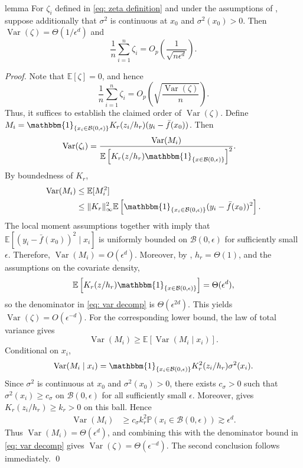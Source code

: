 \documentclass[11pt]{article}
\begin{document}
\begin{appendices}
\begin{restatable}{lemma}{} \label{lemma: zeta}
    For $\zeta_i$ defined in \cref{eq: zeta definition} and under the assumptions of , suppose additionally that $\sigma^2$ is continuous at $x_0$ and $\sigma^2(x_0)>0$. Then $\operatorname{Var}(\zeta) = \Theta(1/\epsilon^d)$ and 
    \[
        \frac{1}{n}\sum_{i = 1}^n\zeta_i = O_p\left(\frac{1}{\sqrt{n\epsilon^d}}\right).
    \]
\end{restatable}
\noindent \textit{Proof.} Note that $\mathbb{E}[\zeta]=0$, and hence
\[
    \frac{1}{n}\sum_{i=1}^n\zeta_i
    =
    O_p\left(\sqrt{\frac{\operatorname{Var}(\zeta)}{n}}\right).
\]
Thus, it suffices to establish the claimed order of $\operatorname{Var}(\zeta)$. Define $M_i=\mathbbm{1}_{\{x_i\in\mathcal{B}(0,\epsilon)\}}K_r(z_i/h_r)(y_i-\bar f(x_0))$. Then
\begin{align}
    \operatorname{Var}(\zeta_i)
    &=
    \frac{\operatorname{Var}(M_i)}
    {\mathbb{E}\left[K_r(z/h_r)\mathbbm{1}_{\{x\in\mathcal{B}(0,\epsilon)\}}\right]^2}.
    \label{eq: var decomp}
\end{align}
By boundedness of $K_r$,
\begin{align*}
    \operatorname{Var}(M_i)
    &\leq
    \mathbb{E}[M_i^2] \\
    &\leq
    \|K_r\|_\infty^2
    \mathbb{E}\left[
    \mathbbm{1}_{\{x_i\in\mathcal{B}(0,\epsilon)\}}
    (y_i-\bar f(x_0))^2
    \right].
\end{align*}
The local moment assumptions together with  imply that $\mathbb{E}[(y_i-\bar f(x_0))^2\mid x_i]$ is uniformly bounded on $\mathcal{B}(0,\epsilon)$ for sufficiently small $\epsilon$. Therefore, $\operatorname{Var}(M_i)=O(\epsilon^d)$. Moreover, by , $h_r=\Theta(1)$, and the assumptions on the covariate density,
\[
    \mathbb{E}\left[K_r(z/h_r)\mathbbm{1}_{\{x\in\mathcal{B}(0,\epsilon)\}}\right]
    =
    \Theta(\epsilon^d),
\]
so the denominator in \cref{eq: var decomp} is $\Theta(\epsilon^{2d})$. This yields $\operatorname{Var}(\zeta)=O(\epsilon^{-d})$. For the corresponding lower bound, the law of total variance gives
\[
    \operatorname{Var}(M_i)
    \geq
    \mathbb{E}[\operatorname{Var}(M_i\mid x_i)].
\]
Conditional on $x_i$,
\[
    \operatorname{Var}(M_i\mid x_i)
    =
    \mathbbm{1}_{\{x_i\in\mathcal{B}(0,\epsilon)\}}
    K_r^2(z_i/h_r)\sigma^2(x_i).
\]
Since $\sigma^2$ is continuous at $x_0$ and $\sigma^2(x_0)>0$, there exists $c_\sigma>0$ such that $\sigma^2(x_i)\geq c_\sigma$ on $\mathcal{B}(0,\epsilon)$ for all sufficiently small $\epsilon$. Moreover,  gives $K_r(z_i/h_r)\geq k_r>0$ on this ball. Hence
\begin{align*}
    \operatorname{Var}(M_i)
    &\geq
    c_\sigma k_r^2
    \mathbb{P}(x_i\in\mathcal{B}(0,\epsilon))
    \gtrsim \epsilon^d.
\end{align*}
Thus $\operatorname{Var}(M_i)=\Theta(\epsilon^d)$, and combining this with the denominator bound in \cref{eq: var decomp} gives $\operatorname{Var}(\zeta)=\Theta(\epsilon^{-d})$. The second conclusion follows immediately. \qed{}


\end{appendices}
\end{document}
